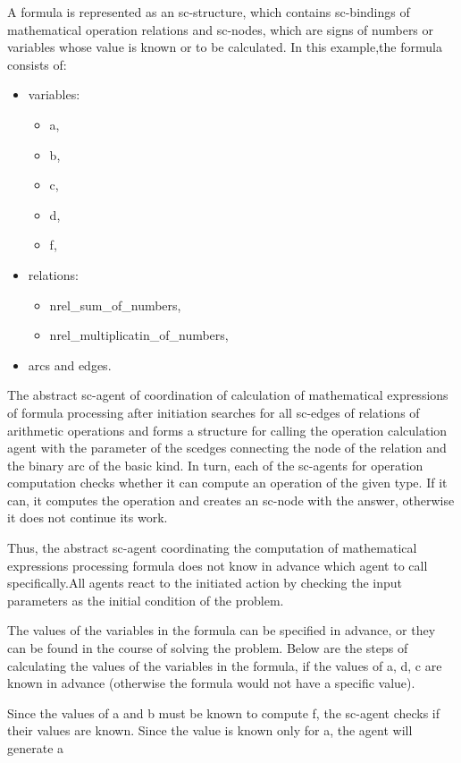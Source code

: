 \documentclass[10pt,a4paper,twocolumn]{article}
\begin{document}
\par \vspace {0.2cm}  A formula is represented as an sc-structure, which contains sc-bindings of mathematical operation relations and sc-nodes, which are signs of numbers or variables whose value is known or to be calculated. In this example,the formula consists of:
\begin{itemize}
 \item variables:
 \begin{itemize} 
\item a,
\item b,
 \item c,
 \item d,
 \item f,
 \end{itemize}
 \item relations:
 \begin{itemize}
\item nrel{\_}sum{\_}of{\_}numbers,
\item nrel{\_}multiplicatin{\_}of{\_}numbers,
\end{itemize}
\item arcs and edges.
\end{itemize}
\par  The abstract sc-agent of coordination of calculation
of mathematical expressions of formula processing after
initiation searches for all sc-edges of relations of arithmetic operations and forms a structure for calling the operation calculation agent with the parameter of the scedges connecting the node of the relation and the binary
arc of the basic kind. In turn, each of the sc-agents for
operation computation checks whether it can compute
an operation of the given type. If it can, it computes
the operation and creates an sc-node with the answer,
otherwise it does not continue its work.
\par  Thus, the abstract sc-agent coordinating the computation of mathematical expressions processing formula does not know in advance which agent to call specifically.All agents react to the initiated action by checking the input parameters as the initial condition of the problem.
\par  The values of the variables in the formula can be specified in advance, or they can be found in the course of solving the problem. Below are the steps of calculating the values of the variables in the formula, if the values of a, d, c are known in advance (otherwise the formula would not have a specific value).
 \par Since the values of a and b must be known to compute f, the sc-agent checks if their values are known. Since the value is known only for a, the agent will generate a
\end{document}
